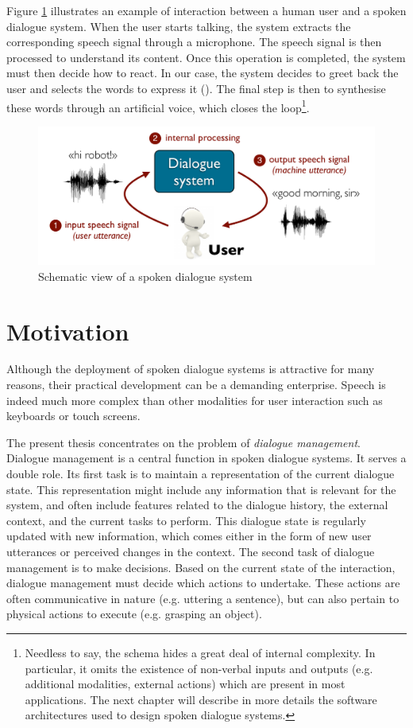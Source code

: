 Figure \ref{fig:basicsds} illustrates an example of interaction between a human user and a spoken dialogue system. When the user starts talking, the system extracts the corresponding speech signal through a microphone.  The speech signal is then processed to understand its content.  Once this operation is completed, the system must then decide how to react.  In our case, the system decides to greet back the user and selects the words to express it (). The final step is then to synthesise these words through an artificial voice, which closes the loop\footnote{ Needless to say, the schema hides a great deal of internal complexity.  In particular, it omits the existence of non-verbal inputs and outputs (e.g. additional modalities, external actions) which are present in most applications.  The next chapter will describe in more details the software architectures used to design spoken dialogue systems.}.

\begin{figure}[h]
\center
\includegraphics[scale=0.45]{imgs/basicsds.pdf}
\caption{Schematic view of a spoken dialogue system}
\label{fig:basicsds}
\end{figure}

\section{Motivation}

Although the deployment of spoken dialogue systems is attractive for many reasons, their practical development can be a demanding enterprise. Speech is indeed much more complex than other modalities for user interaction such as keyboards or touch screens.  

The present thesis concentrates on the problem of \textit{dialogue management}.  Dialogue management is a central function in spoken dialogue systems.  It serves a double role. 
Its first task is to maintain a representation of the current dialogue state. This representation might include any information that is relevant for the system, and often include features related to the dialogue history, the external context, and the current tasks to perform.  This dialogue state is regularly updated with new information, which comes either in the form of new user utterances or perceived changes in the context. The second task of dialogue management is to make decisions.  Based on the current state of the interaction, dialogue management must decide which actions to undertake. These actions are often communicative in nature (e.g. uttering a sentence), but can also pertain to physical actions to execute (e.g. grasping an object).  

